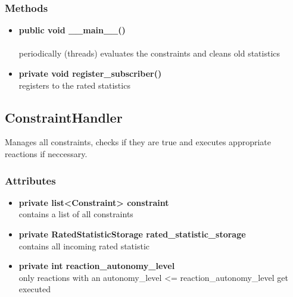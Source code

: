 \subsubsection{Methods}
\begin{itemize}
	\item \textbf{ public void \_\_main\_\_() }\\\\
		periodically (threads) evaluates the constraints and cleans old statistics
	\item \textbf{ private void register\_subscriber() }\\
		registers to the rated statistics
\end{itemize}



\subsection{ConstraintHandler}
Manages all constraints, checks if they are true and executes appropriate reactions if neccessary.

\subsubsection{Attributes}
\begin{itemize}
	\item \textbf{ private list<Constraint> constraint }\\
		contains a list of all constraints
	\item \textbf{ private  RatedStatisticStorage rated\_statistic\_storage }\\
		contains all incoming rated statistic
	\item \textbf{ private  int reaction\_autonomy\_level }\\
		only reactions with an autonomy\_level <= reaction\_autonomy\_level get executed
\end{itemize}
